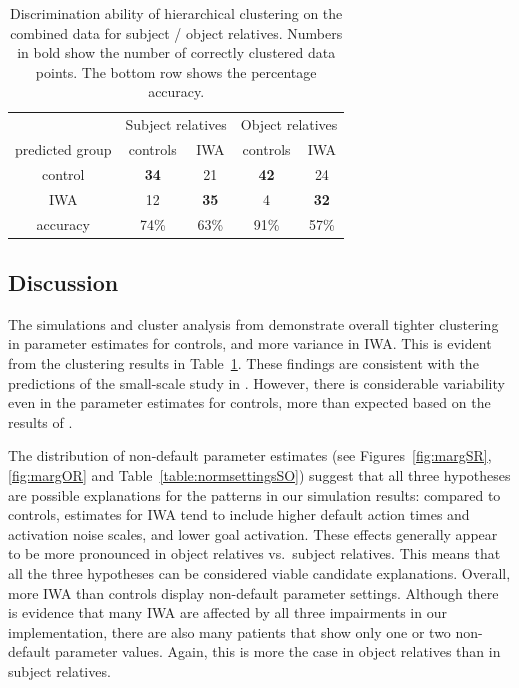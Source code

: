 \documentclass{cambridge7A}\usepackage[]{graphicx}\usepackage[]{color}
\begin{document}
\begin{table}
\begin{tabular}{ccccc}
 &\multicolumn{2}{c}{Subject relatives} & \multicolumn{2}{c}{Object relatives}\\
predicted group &    controls &  IWA & controls & IWA \\ 
         control      &  \textbf{34}             & 21   &        \textbf{42}   & 24\\
         IWA           & 12              & \textbf{35}    &         4    & \textbf{32}\\ 
 \hline        
         accuracy & 74\% & 63\% & 91\% & 57\%
\end{tabular}
\caption{Discrimination ability of hierarchical clustering on the combined data for subject / object relatives. Numbers in bold show the number of correctly clustered data points. The bottom row shows the percentage accuracy.}
  \label{table:hclustSO}
\end{table}


\subsection{Discussion}

The simulations and cluster analysis from \cite{MaetzigEtAltopics2018} demonstrate overall tighter clustering in parameter estimates for controls, and more variance in IWA. This is evident from the clustering results in Table~\ref{table:hclustSO}.
These findings are consistent with the predictions of the small-scale study in \cite{PatilEtAl2016}. However, there is considerable variability even in the parameter estimates for controls, more than expected based on the results of \cite{PatilEtAl2016}.

The distribution of non-default parameter estimates (see Figures~\ref{fig:margSR}, \ref{fig:margOR} and Table~\ref{table:normsettingsSO})
suggest that all three hypotheses are possible explanations for the patterns in our simulation results: compared to controls, estimates for IWA tend to include higher default action times and activation noise scales, and lower goal activation. These effects generally appear to be more pronounced in object relatives vs.\ subject relatives. This means that all the three hypotheses can be considered viable candidate explanations. 
Overall, more IWA than controls display non-default parameter settings. Although there is evidence that many IWA are affected by all three impairments in our implementation, there are also many patients that show only one or two non-default parameter values. Again, this is more the case in object relatives than in subject relatives.
\end{document}
